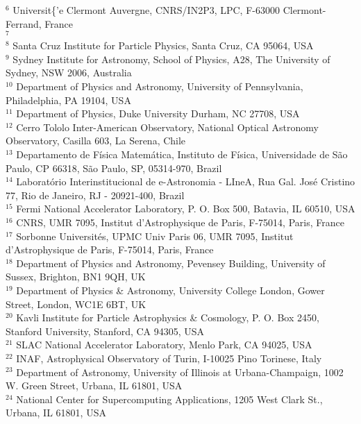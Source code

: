 {{$^{6}$ Universit\{'e} Clermont Auvergne, CNRS/IN2P3, LPC, F-63000 Clermont-Ferrand, France\\
$^{7}$ \\
$^{8}$ Santa Cruz Institute for Particle Physics, Santa Cruz, CA 95064, USA\\
$^{9}$ Sydney Institute for Astronomy, School of Physics, A28, The University of Sydney, NSW 2006, Australia\\
$^{10}$ Department of Physics and Astronomy, University of Pennsylvania, Philadelphia, PA 19104, USA\\
$^{11}$ Department of Physics, Duke University Durham, NC 27708, USA\\
$^{12}$ Cerro Tololo Inter-American Observatory, National Optical Astronomy Observatory, Casilla 603, La Serena, Chile\\
$^{13}$ Departamento de F\'isica Matem\'atica, Instituto de F\'isica, Universidade de S\~ao Paulo, CP 66318, S\~ao Paulo, SP, 05314-970, Brazil\\
$^{14}$ Laborat\'orio Interinstitucional de e-Astronomia - LIneA, Rua Gal. Jos\'e Cristino 77, Rio de Janeiro, RJ - 20921-400, Brazil\\
$^{15}$ Fermi National Accelerator Laboratory, P. O. Box 500, Batavia, IL 60510, USA\\
$^{16}$ CNRS, UMR 7095, Institut d'Astrophysique de Paris, F-75014, Paris, France\\
$^{17}$ Sorbonne Universit\'es, UPMC Univ Paris 06, UMR 7095, Institut d'Astrophysique de Paris, F-75014, Paris, France\\
$^{18}$ Department of Physics and Astronomy, Pevensey Building, University of Sussex, Brighton, BN1 9QH, UK\\
$^{19}$ Department of Physics \& Astronomy, University College London, Gower Street, London, WC1E 6BT, UK\\
$^{20}$ Kavli Institute for Particle Astrophysics \& Cosmology, P. O. Box 2450, Stanford University, Stanford, CA 94305, USA\\
$^{21}$ SLAC National Accelerator Laboratory, Menlo Park, CA 94025, USA\\
$^{22}$ INAF, Astrophysical Observatory of Turin, I-10025 Pino Torinese, Italy\\
$^{23}$ Department of Astronomy, University of Illinois at Urbana-Champaign, 1002 W. Green Street, Urbana, IL 61801, USA\\
$^{24}$ National Center for Supercomputing Applications, 1205 West Clark St., Urbana, IL 61801, USA\\
}
